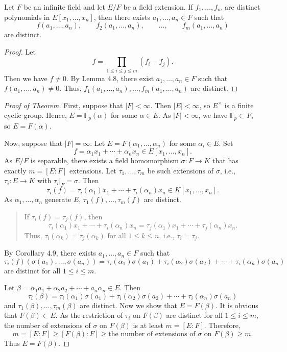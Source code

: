 \documentclass[twoside]{article}
\newcommand\F{\mathbb F}
\theoremstyle{remark}
\begin{document}
\begin{corollary}
  Let \(F\) be an infinite field and let \(E/F\) be a field extension. If \(f_1, \dots, f_m\) are distinct polynomials in \(E[x_1, \dots, x_n]\), then there exists \(a_1, \dots, a_n \in F\) such that
  \[ f(a_1, \dots, a_n), \qquad f_2(a_1, \dots, a_n), \qquad \dots, \qquad f_m(a_1, \dots, a_n) \]
  are distinct.
\end{corollary}

\begin{proof}
  Let
  \[ f = \prod_{1 \leq i \leq j \leq m} (f_i-f_j). \]
  Then we have \(f \neq 0\). By Lemma 4.8, there exist \(a_1, \dots, a_n \in F\) such that \(f(a_1, \dots, a_n) \neq 0\). Thus, \(f_1(a_1, \dots, a_n), \dots, f_m(a_1, \dots, a_n)\) are distinct.
\end{proof}

\begin{proof}[Proof of Theorem]
  First, suppose that \(|F| < \infty\). Then \(|E| < \infty\), so \(E^\times\) is a finite cyclic group. Hence, \(E = \F_p(\alpha)\) for some \(\alpha \in E\). As \(|F| < \infty\), we have \(\F_p \subset F\), so \(E = F(\alpha)\).
  
  Now, suppose that \(|F| = \infty\). Let \(E = F(\alpha_1, \dots, \alpha_n)\) for some \(\alpha_i \in E\). Set
  \[ f = \alpha_1x_1 + \cdots + \alpha_nx_n \in E[x_1, \dots, x_n]. \]
  As \(E/F\) is separable, there exists a field homomorphism \(\sigma\colon F \to K\) that has exactly \(m = [E:F]\) extensions. Let \(\tau_1, \dots, \tau_m\) be such extensions of \(\sigma\), i.e., \(\tau_i\colon E \to K\) with \(\tau_i|_F = \sigma\). Then
  \[ \tau_i(f) = \tau_i(\alpha_1)x_1 + \cdots + \tau_i(\alpha_n)x_n \in K [x_1, \dots, x_n]. \]
  As \(\alpha_1, \dots, \alpha_n\) generate \(E\), \(\tau_1(f), \dots, \tau_m(f)\) are distinct.
  \begin{quote}\small
    If \(\tau_i(f) = \tau_j(f)\), then
    \[ \tau_i(\alpha_1)x_1 + \cdots + \tau_i(\alpha_n)x_n = \tau_j(\alpha_1)x_1 + \cdots + \tau_j(\alpha_n)x_n. \]
    Thus, \(\tau_i(\alpha_k) = \tau_j(\alpha_k)\) for all \(1 \leq k \leq n\), i.e., \(\tau_i = \tau_j\).
  \end{quote}
  By Corollary 4.9, there exists \(a_1, \dots, a_n \in F\) such that
  \[ \tau_i(f) (\sigma(a_1), \dots, \sigma(a_n)) = \tau_i(\alpha_1) \sigma(a_1) + \tau_i(\alpha_2) \sigma(a_2) + \cdots + \tau_i(\alpha_n) \sigma(a_n) \]
  are distinct for all \(1 \leq i \leq m\).
  
  Let \(\beta = \alpha_1a_1 + \alpha_2a_2 + \cdots + a_n\alpha_n \in E\). Then
  \[ \tau_i(\beta) = \tau_i(\alpha_1)\sigma(a_1) + \tau_i(\alpha_2)\sigma(a_2) + \cdots + \tau_i(\alpha_n)\sigma(a_n) \]
  and \(\tau_1(\beta), \dots, \tau_m(\beta)\) are distinct. Now we show that \(E = F(\beta)\). It is obvious that \(F(\beta) \subset E\). As the restriction of \(\tau_i\) on \(F(\beta)\) are distinct for all \(1 \leq i \leq m\), the number of extensions of \(\sigma\) on \(F(\beta)\) is at least \(m = [E:F]\). Therefore,
  \[ m = [E:F] \geq [F(\beta):F] \geq \text{the number of extensions of \(\sigma\) on \(F(\beta)\)} \geq m. \]
  Thus \(E = F(\beta)\).
\end{proof}
\end{document}
